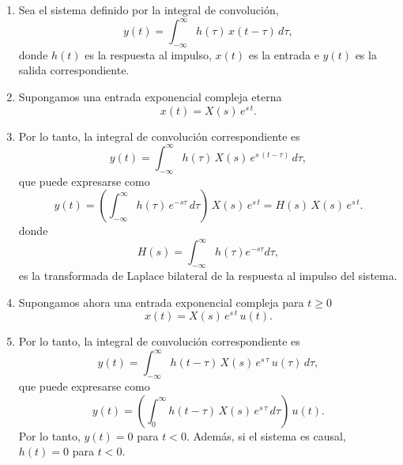 \begin{enumerate}

\item Sea el sistema definido por la integral de convoluci\'{o}n, 
\begin{equation}
 y\left( t\right) =
    \int_{-\infty }^{\infty }h\left( \tau \right) \, x\left(t-\tau
    \right) \, d\tau ,
\end{equation}
donde $h\left( t\right) $ es la respuesta al impulso, $x\left( t\right) $ es la entrada e 
$y\left( t\right) $ es la salida correspondiente.

\item Supongamos una entrada exponencial compleja eterna
\begin{equation}
        x\left( t\right) =X(s) \, e^{s \, t}.
\end{equation}

\item Por lo tanto, la integral de convoluci\'{o}n correspondiente es 
\begin{equation}
y\left( t\right) =\int_{-\infty }^{\infty }h\left( \tau \right) \,
X(s) \, e^{s \, \left(t-\tau \right) } \, d\tau ,
\end{equation}
que puede expresarse como 
\begin{equation}
    y\left( t\right) =
    \left( \int_{-\infty }^{\infty }h\left( \tau\right) \, e^{-s\tau }
      \, d\tau \right) \,  X(s) \, e^{s \, t} =
    H\left( s\right) \, X(s) \, e^{s \, t}.
\end{equation}
donde 
\begin{equation}
        H\left( s\right) =\int_{-\infty }^{\infty }h\left( \tau \right) e^{-s\tau}d\tau,
        \label{laplacebilateral}
\end{equation}
es la transformada de Laplace bilateral de la respuesta al impulso del sistema.

\item Supongamos ahora una entrada exponencial compleja para $t \geq 0$
\begin{equation}
        x\left( t\right) = X(s) \, e^{s \, t} \, u(t).
\end{equation}

\item Por lo tanto, la integral de convoluci\'{o}n correspondiente es 
\begin{equation}
  y\left( t\right) =
    \int_{-\infty}^{\infty }h\left( t - \tau \right) \, X(s) \, e^{s \,
      \tau} \, u(\tau) \, d\tau ,
\end{equation}
que puede expresarse como 
\begin{equation}
    y\left( t\right) =
    \left( \int_{0}^{\infty }h\left(t - \tau\right) \, X(s) \,  e^{s \,
      \tau} \, d\tau \right) \, u(t).
\end{equation}
Por lo tanto, $y(t) = 0$ para $t < 0$. Además, si el sistema es causal, $h(t) = 0$ para $t < 0$.


\end{enumerate}
